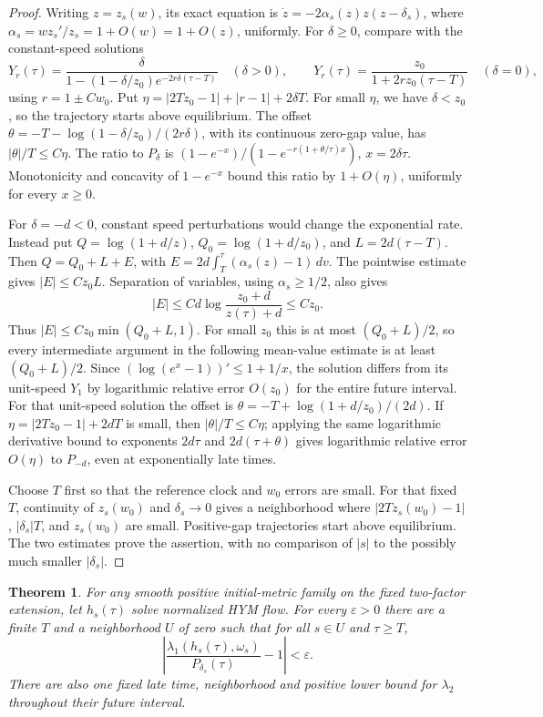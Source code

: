 \documentclass[11pt]{amsart}
\newtheorem{theorem}{Theorem}[section]
\theoremstyle{definition}
\theoremstyle{remark}
\begin{document}
\begin{proof}
Writing \(z=z_s(w)\), its exact equation is
\(\dot z=-2\alpha_s(z)z(z-\delta_s)\), where
\(\alpha_s=wz_s'/z_s=1+O(w)=1+O(z)\), uniformly.
For \(\delta\ge0\), compare with the constant-speed solutions
\[
 Y_r(\tau)=\frac{\delta}
 {1-(1-\delta/z_0)e^{-2r\delta(\tau-T)}}
 \quad(\delta>0),\qquad
 Y_r(\tau)=\frac{z_0}{1+2rz_0(\tau-T)}\quad(\delta=0),
\]
using \(r=1\pm Cw_0\). Put
\(\eta=|2Tz_0-1|+|r-1|+2\delta T\). For small \(\eta\),
we have \(\delta<z_0\), so the trajectory starts above equilibrium.
The offset
\(\theta=-T-\log(1-\delta/z_0)/(2r\delta)\), with its
continuous zero-gap value, has \(|\theta|/T\le C\eta\).
The ratio to \(P_\delta\) is
\((1-e^{-x})/(1-e^{-r(1+\theta/\tau)x})\), \(x=2\delta\tau\).
Monotonicity and concavity of \(1-e^{-x}\) bound this ratio by
\(1+O(\eta)\), uniformly for every \(x\ge0\).

For \(\delta=-d<0\), constant speed perturbations would change
the exponential rate. Instead put
\(Q=\log(1+d/z)\), \(Q_0=\log(1+d/z_0)\), and
\(L=2d(\tau-T)\). Then \(Q=Q_0+L+E\), with
\(E=2d\int_T^\tau(\alpha_s(z)-1)\,dv\).
The pointwise estimate gives \(|E|\le Cz_0L\). Separation of
variables, using \(\alpha_s\ge1/2\), also gives
\[
 |E|\le Cd\log\frac{z_0+d}{z(\tau)+d}\le Cz_0.
\]
Thus \(|E|\le Cz_0\min(Q_0+L,1)\). For small \(z_0\) this
is at most \((Q_0+L)/2\), so every intermediate argument in the
following mean-value estimate is at least \((Q_0+L)/2\). Since
\((\log(e^x-1))'\le1+1/x\), the solution differs from its
unit-speed \(Y_1\) by logarithmic relative error \(O(z_0)\)
for the entire future interval. For that unit-speed solution the
offset is \(\theta=-T+\log(1+d/z_0)/(2d)\).
If \(\eta=|2Tz_0-1|+2dT\) is small, then
\(|\theta|/T\le C\eta\); applying the same logarithmic derivative
bound to exponents \(2d\tau\) and \(2d(\tau+\theta)\) gives
logarithmic relative error \(O(\eta)\) to \(P_{-d}\), even at
exponentially late times.

Choose \(T\) first so that the reference clock and \(w_0\) errors
are small. For that fixed \(T\), continuity of \(z_s(w_0)\)
and \(\delta_s\to0\) gives a neighborhood where
\(|2Tz_s(w_0)-1|\), \(|\delta_s|T\), and \(z_s(w_0)\)
are small. Positive-gap trajectories start above equilibrium.
The two estimates prove the assertion, with no comparison of
\(|s|\) to the possibly much smaller \(|\delta_s|\).
\end{proof}

\begin{theorem}\label{thm05:joint}
For any smooth positive initial-metric family on the fixed two-factor
extension, let \(h_s(\tau)\) solve normalized HYM flow. For every
\(\varepsilon>0\) there are a finite \(T\) and a neighborhood
\(U\) of zero such that for all \(s\in U\) and \(\tau\ge T\),
\begin{equation}\label{eq05:joint}
 \left|\frac{\lambda_1(h_s(\tau),\omega_s)}
                         {P_{\delta_s}(\tau)}-1\right|<\varepsilon.
\end{equation}
There are also one fixed late time, neighborhood and positive lower
bound for \(\lambda_2\) throughout their future interval.
\end{theorem}
\end{document}
